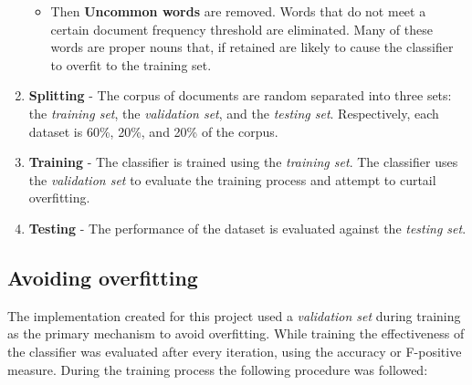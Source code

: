 \documentclass[final,3p,12pt]{elsarticle}
\begin{document}
\begin{enumerate}
\begin{itemize}
            \item Then \textbf{Uncommon words} are removed. Words that do not
                meet a certain document frequency threshold are eliminated.
                Many of these words are proper nouns that, if retained are
                likely to cause the classifier to overfit to the training set.

        \end{itemize}

    \item \textbf{Splitting} - The corpus of documents are random separated
        into three sets: the \textit{training set}, the \textit{validation set},
        and the \textit{testing set}. Respectively, each dataset is 60\%, 20\%,
        and 20\% of the corpus.

    \item \textbf{Training} - The classifier is trained using the
        \textit{training set}.  The classifier uses the \textit{validation set}
        to evaluate the training process and attempt to curtail overfitting.

    \item \textbf{Testing} - The performance of the dataset is evaluated
        against the \textit{testing set}.

\end{enumerate}

\subsection{Avoiding overfitting}

The implementation created for this project used a \textit{validation set} during
training as the primary mechanism to avoid overfitting. While training the
effectiveness of the classifier was evaluated after every iteration, using the
accuracy or F-positive measure. During the training process the following
procedure was followed:
\end{document}
